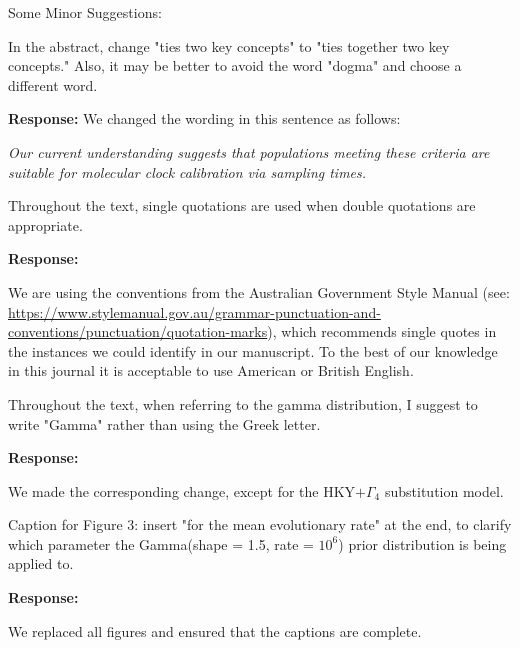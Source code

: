\documentclass[11pt]{article}
\begin{document}
Some Minor Suggestions:

In the abstract, change "ties two key concepts" to "ties together two key concepts." Also, it may be better to avoid the word "dogma" and choose a different word.

{\color{blue}
\textbf{Response:}
We changed the wording in this sentence as follows:

\textit{Our current understanding suggests that populations meeting these criteria are suitable for molecular clock calibration via sampling times.}
}


Throughout the text, single quotations are used when double quotations are appropriate.

{\color{blue}
\textbf{Response:}
	
We are using the conventions from the Australian Government Style Manual (see: \url{ https://www.stylemanual.gov.au/grammar-punctuation-and-conventions/punctuation/quotation-marks}), which recommends single quotes in the instances we could identify in our manuscript. To the best of our knowledge in this journal it is acceptable to use American or British English.
}

Throughout the text, when referring to the gamma distribution, I suggest to write "Gamma" rather than using the Greek letter.


{\color{blue}
	\textbf{Response:}

We made the corresponding change, except for the HKY$+\Gamma_4$ substitution model.
}


Caption for Figure 3: insert "for the mean evolutionary rate" at the end, to clarify which parameter the Gamma(shape =  1.5, rate = $10^6$) prior distribution is being applied to.

{\color{blue}
	\textbf{Response:}
	
	We replaced all figures and ensured that the captions are complete. 
}





%

\end{document}
